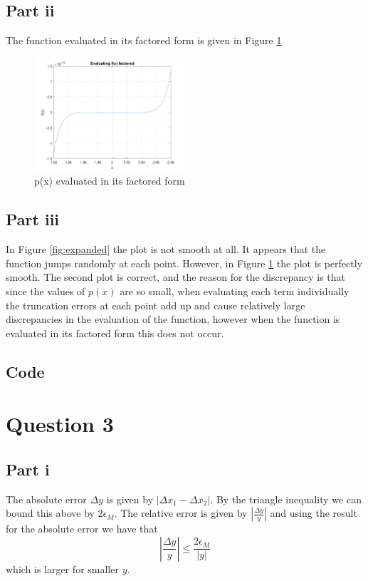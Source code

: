 \documentclass[12pt]{exam}
\begin{document}
\subsection*{Part ii}
The function evaluated in its factored form is given in Figure \ref{fig:factored}
\begin{figure}[h!]
\centering
\includegraphics[width=0.5\textwidth]{q2p2.png}
\caption{p(x) evaluated in its factored form}\label{fig:factored}
\end{figure}
\subsection*{Part iii}

In Figure \ref{fig:expanded} the plot is not smooth at all. It appears that the function jumps randomly at each point. However, in Figure \ref{fig:factored} the plot is perfectly smooth. The second plot is correct, and the reason for the discrepancy is that since the values of $p(x)$ are so small, when evaluating each term individually the truncation errors at each point add up and cause relatively large discrepancies in the evaluation of the function, however when the function is evaluated in its factored form this does not occur.

\subsection*{Code}


\newpage

\section*{Question 3}

\subsection*{Part i}
The absolute error $\Delta y$ is given by $|\Delta x_1-\Delta x_2|$. By the triangle inequality we can bound this above by $2\epsilon_M$. The relative error is given by $\left|\frac{\Delta y}{y}\right|$ and using the result for the absolute error we have that 
\begin{equation}\left|\frac{\Delta y}{y}\right| \le \frac{2\epsilon_M}{|y|}\end{equation}
which is larger for smaller $y$.
\end{document}
